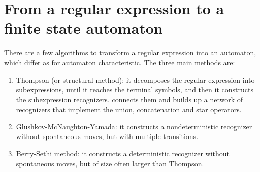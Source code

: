 \section{From a regular expression to a finite state automaton}

There are a few algorithms to transform a regular expression into an automaton, which differ as for automaton characteristic. 
The three main methods are:
\begin{enumerate}
    \item Thompson (or structural method): it decomposes the regular expression into subexpressions, until it reaches the terminal symbols, and then it constructs the subexpression recognizers, connects them and builds up a network of recognizers that implement the union, concatenation and star operators.
    \item Glushkov-McNaughton-Yamada: it constructs a nondeterministic recognizer without spontaneous moves, but with multiple transitions.
    \item Berry-Sethi method: it constructs a deterministic recognizer without spontaneous moves, but of size often larger than Thompson. 
\end{enumerate}

